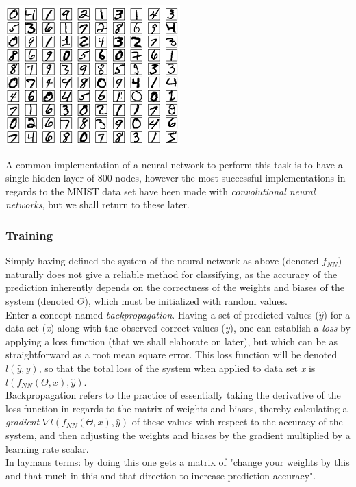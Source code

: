 \begin{Figure}
 \centering
 \includegraphics[width=0.7\linewidth]{images/mnist}
 \captionsetup{width=0.8\linewidth, font=small}
\end{Figure}

\noindent A common implementation of a neural network to perform this task is to have a single hidden layer of 800 nodes, however the most successful implementations in regards to the MNIST data set have been made with \textit{convolutional neural networks}, but we shall return to these later.

\subsubsection{Training}
Simply having defined the system of the neural network as above (denoted $f_{NN}$) naturally does not give a reliable method for classifying, as the accuracy of the prediction inherently depends on the correctness of the weights and biases of the system (denoted $\Theta$), which must be initialized with random values. \\
Enter a concept named \textit{backpropagation}. Having a set of predicted values ($\hat{y}$) for a data set (\textit{x}) along with the observed correct values (\textit{y}), one can establish a \textit{loss} by applying a loss function (that we shall elaborate on later), but which can be as straightforward as a root mean square error. This loss function will be denoted $l(\hat{y},y)$, so that the  total loss of the system when applied to data set \textit{x} is $l(f_{NN}(\Theta, x), \hat{y})$.\\
Backpropagation refers to the practice of essentially taking the derivative of the loss function in regards to the matrix of weights and biases, thereby calculating a \textit{gradient} $\nabla{l(f_{NN}(\Theta, x), \hat{y})}$ of these values with respect to the accuracy of the system, and then adjusting the weights and biases by the gradient multiplied by a learning rate scalar.\\
In laymans terms: by doing this one gets a matrix of "change your weights by this and that much in this and that direction to increase prediction accuracy".


